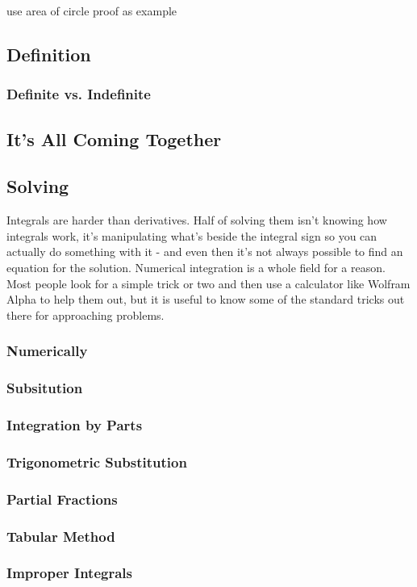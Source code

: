 use area of circle proof as example
\subsection{Definition}
\subsubsection{Definite vs. Indefinite}
\subsection{It's All Coming Together}
\subsection{Solving}
Integrals are harder than derivatives. Half of solving them isn't knowing how integrals work, it's manipulating what's beside the integral sign so you can actually do something with it - and even then it's not always possible to find an equation for the solution. Numerical integration is a whole field for a reason. Most people look for a simple trick or two and then use a calculator like Wolfram Alpha to help them out, but it is useful to know some of the standard tricks out there for approaching problems.
\subsubsection{Numerically}
\subsubsection{Subsitution}
\subsubsection{Integration by Parts}
\subsubsection{Trigonometric Substitution}
\subsubsection{Partial Fractions}
\subsubsection{Tabular Method}
\subsubsection{Improper Integrals}